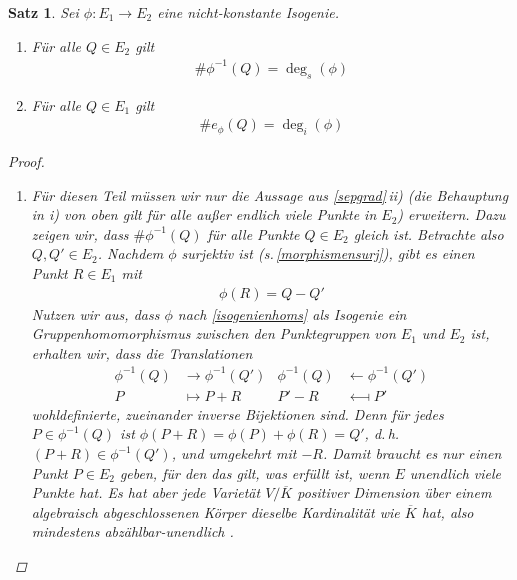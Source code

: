 \documentclass[english, german, parskip=half]{scrartcl}
\newtheorem{Satz}{Satz}[section]
\theoremstyle{definition}
\theoremstyle{remark}
\newcommand*{\algK}{\ensuremath{\overline K}} %
\newcommand*{\longto}{\longrightarrow}
\newcommand*{\longfrom}{\longleftarrow}
\newcommand*{\degs}{\operatorname{\deg}_s} %
\newcommand*{\degi}{\operatorname{\deg}_i} %
\begin{document}
\begin{Satz}\label{sepgrad2}
  Sei $\phi\colon E_1\to E_2$ eine nicht-konstante Isogenie.
  \begin{enumerate}[label=\roman*)]
  \item Für alle $Q\in E_2$ gilt
    \begin{gather*}
      \#\phi^{-1}(Q) = \degs(\phi)
    \end{gather*}
  \item Für alle $Q\in E_1$ gilt
    \begin{gather*}
      \#e_{\phi}(Q) = \degi(\phi)
    \end{gather*}
  \end{enumerate}
\begin{proof}~
  \begin{enumerate}[label=\roman*)]
  \item Für diesen Teil müssen wir nur die Aussage aus
    \autoref{sepgrad}\,ii) (die Behauptung in \emph{i)} von oben gilt
    für alle außer endlich viele Punkte in $E_2$) erweitern. Dazu
    zeigen wir, dass $\#\phi^{-1}(Q)$ für alle Punkte $Q\in E_2$
    gleich ist. 
    Betrachte also $Q,Q'\in E_2$. Nachdem $\phi$ surjektiv ist
    (s.\,\autoref{morphismensurj}), gibt es einen Punkt $R\in E_1$ mit
    \begin{gather*}
      \phi(R) = Q - Q'
    \end{gather*}
    Nutzen wir aus, dass $\phi$  nach \autoref{isogenienhoms} als
    Isogenie ein Gruppenhomomorphismus zwischen den Punktegruppen von
    $E_1$ und $E_2$ ist, erhalten wir, dass die Translationen
    \begin{align*}
      \phi^{-1}(Q) &\longto \phi^{-1}(Q')
      &\phi^{-1}(Q) &\longfrom \phi^{-1}(Q')\\
      P &\longmapsto P+R
      &P'-R &\longmapsfrom P'
    \end{align*}
    wohldefinierte, zueinander inverse Bijektionen sind.
    Denn für jedes $P\in\phi^{-1}(Q)$ ist
    $\phi(P+R)=\phi(P)+\phi(R)=Q'$, d.\,h. $(P+R)\in\phi^{-1}(Q')$,
    und umgekehrt mit $-R$.
    Damit braucht es nur einen Punkt $P\in E_2$ geben, für den das
    gilt, was erfüllt ist, wenn $E$ unendlich viele Punkte hat.
    Es hat aber jede Varietät $V/\algK$ positiver Dimension
    über einem algebraisch abgeschlossenen Körper dieselbe
    Kardinalität wie $\algK$ hat, also mindestens abzählbar-unendlich
    \cite[siehe][Exercise I.4.8 oder Section I.6]{hartshorne}.
    

\end{enumerate}
\end{proof}
\end{Satz}
\end{document}
